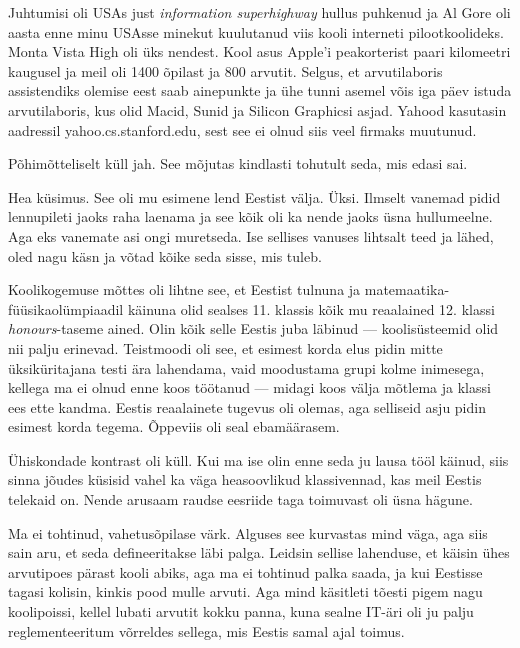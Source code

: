 Juhtumisi oli USAs just \emph{information 
superhighway} hullus puhkenud ja Al Gore oli aasta enne 
minu USAsse minekut kuulutanud viis kooli interneti 
pilootkoolideks. Monta Vista High oli üks nendest. Kool asus
Apple'i peakorterist paari kilomeetri kaugusel ja meil oli 1400 õpilast ja 800 arvutit. Selgus, et arvutilaboris 
assistendiks olemise eest saab ainepunkte ja ühe tunni asemel võis iga 
päev istuda arvutilaboris, kus olid Macid, Sunid ja Silicon Graphicsi 
asjad. Yahood kasutasin aadressil yahoo.cs.stanford.edu, sest see ei olnud siis veel 
firmaks muutunud.


Põhimõtteliselt küll jah. See mõjutas kindlasti tohutult seda, mis edasi 
sai. 


Hea küsimus. See oli mu esimene lend Eestist välja. Üksi. Ilmselt vanemad 
pidid lennupileti jaoks raha laenama ja see kõik oli ka 
nende jaoks üsna hullumeelne. Aga eks vanemate 
asi ongi muretseda. Ise sellises vanuses lihtsalt teed ja lähed, 
oled nagu käsn ja võtad kõike seda sisse, mis tuleb. 

Koolikogemuse mõttes oli lihtne
see, et Eestist tulnuna ja matemaatika-füüsikaolümpiaadil käinuna olid sealses
11. klassis kõik mu reaalained 12. klassi \emph{honours}-taseme ained. Olin kõik selle Eestis juba läbinud --- koolisüsteemid olid nii palju erinevad. 
Teistmoodi oli see, et esimest korda elus pidin 
mitte üksiküritajana testi ära lahendama, vaid moodustama grupi kolme inimesega, 
kellega ma ei olnud enne koos töötanud --- midagi koos välja mõtlema ja klassi ees 
ette kandma. Eestis reaalainete tugevus oli olemas, aga selliseid asju pidin esimest korda tegema. Õppeviis oli seal 
ebamäärasem. 

Ühiskondade kontrast oli küll. Kui ma ise olin enne seda ju lausa tööl käinud, 
siis sinna jõudes küsisid vahel ka väga heasoovlikud klassivennad, kas meil 
Eestis telekaid on. Nende arusaam raudse eesriide taga 
toimuvast oli üsna hägune. 


Ma ei tohtinud, vahetusõpilase värk. Alguses see kurvastas mind 
väga, aga siis sain aru, et seda defineeritakse läbi palga. Leidsin sellise lahenduse, et käisin 
ühes arvutipoes pärast kooli abiks, aga ma ei tohtinud palka saada, ja kui 
Eestisse tagasi kolisin, kinkis pood mulle arvuti. Aga mind käsitleti tõesti pigem nagu 
koolipoissi, kellel lubati arvutit kokku panna, kuna sealne IT-äri oli ju palju 
reglementeeritum võrreldes sellega, mis Eestis samal ajal toimus. 

